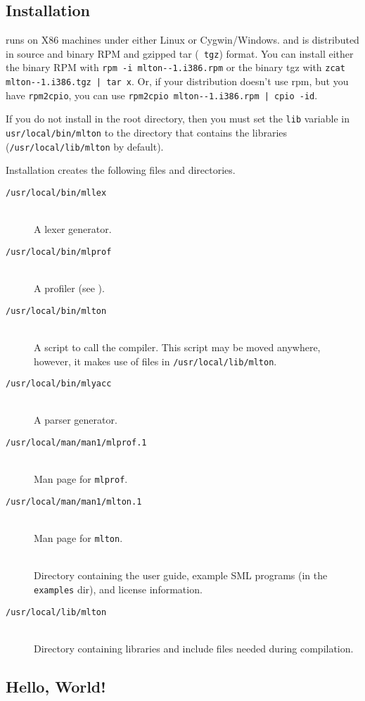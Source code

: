 
\subsection{Installation}

{\mlton} runs on X86 machines under either Linux or Cygwin/Windows.
and is distributed in source and binary RPM and gzipped tar ({\tt
tgz}) format.  You can install either the binary RPM with {\tt rpm -i
mlton-\version-1.i386.rpm} or the binary tgz with {\tt zcat
mlton-\version-1.i386.tgz | tar x}.  Or, if your distribution doesn't
use rpm, but you have {\tt rpm2cpio}, you can use {\tt rpm2cpio
mlton-\version-1.i386.rpm | cpio -id}.

If you do not install {\mlton} in the root directory, then you must
set the {\tt lib} variable in {\tt usr/local/bin/mlton} to the
directory that contains the libraries ({\tt /usr/local/lib/mlton} by
default).

Installation creates the following files and directories.

\newcommand{\place}[1]{\item[\tt #1]\hspace{1in}\\}

\begin{description}

\place{/usr/local/bin/mllex}
A lexer generator.

\place{/usr/local/bin/mlprof}
A profiler (see ).

\place{/usr/local/bin/mlton}
A script to call the compiler.
This script may be moved anywhere, however,
it makes use of files in {\tt /usr/local/lib/mlton}.

\place{/usr/local/bin/mlyacc}
A parser generator.

\place{/usr/local/man/man1/mlprof.1}
Man page for {\tt mlprof}.

\place{/usr/local/man/man1/mlton.1}
Man page for {\tt mlton}.

\place{\doc}
Directory containing the user guide, example SML programs (in the {\tt examples}
dir), and license information.

\place{/usr/local/lib/mlton}
Directory containing libraries and include files needed during
compilation.

\end{description}

\subsection{Hello, World!}

